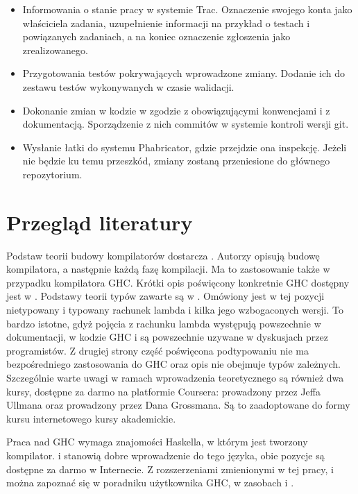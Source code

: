 \begin{itemize}
  \item Informowania o stanie pracy w systemie Trac. Oznaczenie swojego konta jako właściciela zadania, uzupełnienie informacji na przykład o testach i powiązanych zadaniach, a na koniec oznaczenie zgłoszenia jako zrealizowanego.
  \item Przygotowania testów pokrywających wprowadzone zmiany. Dodanie ich do zestawu testów wykonywanych w czasie walidacji.
  \item Dokonanie zmian w kodzie w zgodzie z obowiązującymi konwencjami i z dokumentacją. Sporządzenie z nich commitów w systemie kontroli wersji git.
  \item Wysłanie łatki do systemu Phabricator, gdzie przejdzie ona inspekcję. Jeżeli nie będzie ku temu przeszkód, zmiany zostaną przeniesione do głównego repozytorium.
\end{itemize}

\section{Przegląd literatury}\label{sec:przeglad_literatury}

Podstaw teorii budowy kompilatorów dostarcza \cite{Dragon}. Autorzy opisują budowę kompilatora, a następnie każdą fazę kompilacji. Ma to zastosowanie także w przypadku kompilatora GHC. Krótki opis poświęcony konkretnie GHC dostępny jest w \cite{AOSA}. Podstawy teorii typów zawarte są w \cite{TAPL}. Omówiony jest w tej pozycji nietypowany i typowany rachunek lambda i kilka jego wzbogaconych wersji. To bardzo istotne, gdyż pojęcia z rachunku lambda występują powszechnie w dokumentacji, w kodzie GHC i są powszechnie uzywane w dyskusjach przez programistów. Z drugiej strony część poświęcona podtypowaniu nie ma bezpośredniego zastosowania do GHC oraz opis nie obejmuje typów zależnych. Szczególnie warte uwagi w ramach wprowadzenia teoretycznego są również dwa kursy, dostępne za darmo na platformie Coursera:  prowadzony przez Jeffa Ullmana oraz  prowadzony przez Dana Grossmana. Są to zaadoptowane do formy kursu internetowego kursy akademickie.

Praca nad GHC wymaga znajomości Haskella, w którym jest tworzony kompilator. \cite{LearnYouAHaskell} i \cite{RealWorldHaskell} stanowią dobre wprowadzenie do tego języka, obie pozycje są dostępne za darmo w Internecie. Z rozszerzeniami zmienionymi w tej pracy,  i  można zapoznać się w poradniku użytkownika GHC, w zasobach \cite{GuideTypeFamilies} i \cite{GuidePartialTypeSignatures}.

